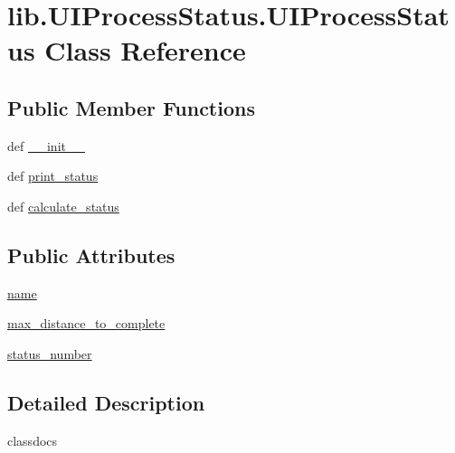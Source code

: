 \hypertarget{classlib_1_1_u_i_process_status_1_1_u_i_process_status}{\section{lib.\-U\-I\-Process\-Status.\-U\-I\-Process\-Status Class Reference}
\label{classlib_1_1_u_i_process_status_1_1_u_i_process_status}
}
\subsection*{Public Member Functions}
\begin{DoxyCompactItemize}
\item 
def \hyperlink{classlib_1_1_u_i_process_status_1_1_u_i_process_status_a7e8bd62b84eb2304dd16ea4cfe215b82}{\-\_\-\-\_\-init\-\_\-\-\_\-}
\item 
def \hyperlink{classlib_1_1_u_i_process_status_1_1_u_i_process_status_a328662bd85afff72c829cdd356818d81}{print\-\_\-status}
\item 
def \hyperlink{classlib_1_1_u_i_process_status_1_1_u_i_process_status_a5f301929615bf7129b3f7408ccb7323e}{calculate\-\_\-status}
\end{DoxyCompactItemize}
\subsection*{Public Attributes}
\begin{DoxyCompactItemize}
\item 
\hyperlink{classlib_1_1_u_i_process_status_1_1_u_i_process_status_ac8e559e5d67a90a74409b0ac97579fa4}{name}
\item 
\hyperlink{classlib_1_1_u_i_process_status_1_1_u_i_process_status_a71b168a9795337f39cd9a043095ca679}{max\-\_\-distance\-\_\-to\-\_\-complete}
\item 
\hyperlink{classlib_1_1_u_i_process_status_1_1_u_i_process_status_a7f891dd871866f2b9c30491b92c4a701}{status\-\_\-number}
\end{DoxyCompactItemize}


\subsection{Detailed Description}
\begin{DoxyVerb}classdocs
\end{DoxyVerb}
 

